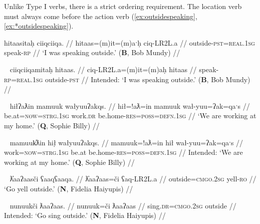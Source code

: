Unlike Type I verbs, there is a strict ordering requirement. The location verb must always come before the action verb (\ref{ex:outsidespeaking}, \ref{ex:*outsidespeaking}). 

\ex \label{ex:outsidespeaking}
\begingl
\glpreamble hitaasitaḥ ciiqciiqa. //
\gla hitaas=(m)it=(m)aˑḥ ciq-LR2L.a  //
\glb outside-\textsc{pst}=\textsc{real.1sg} speak-\textsc{rp} //
\glft `I was speaking outside.' (\textbf{B}, Bob Mundy) //
\endgl
\xe

\ex~ \label{ex:*outsidespeaking}
\begingl
\glpreamble *ciiqciiqamitaḥ hitaas. //
\gla ciq-LR2L.a=(m)it=(m)aḥ hitaas  //
\glb speak-\textsc{rp}=\textsc{real.1sg} outside-\textsc{pst} //
\glft Intended: `I was speaking outside.' (\textbf{B}, Bob Mundy) //
\endgl
\xe

\ex~ \label{ex:workathome}
\begingl
\glpreamble hiłʔaƛin mamuuk wałyuuʔakqs. //
\gla hił=!aƛ=in mamuuk wał-yuu=ʔak=qaˑs  //
\glb be.at=\textsc{now}=\textsc{strg.1sg} work.\textsc{dr} be.home-\textsc{res}=\textsc{poss}=\textsc{defn.1sg} //
\glft `We are working at my home.' (\textbf{Q}, Sophie Billy) //
\endgl
\xe

\ex~ \label{ex:*workathome}
\begingl
\glpreamble *mamuuk̓ƛin hił̣ wałyuuʔakqs. //
\gla mamuuk=!aƛ=in hił wał-yuu=ʔak=qaˑs  //
\glb work=\textsc{now}=\textsc{strg.1sg} be.at be.home-\textsc{res}=\textsc{poss}=\textsc{defn.1sg} //
\glft Intended: `We are working at my home.' (\textbf{Q}, Sophie Billy) //
\endgl
\xe

\ex~ \label{ex:shoutoutside}
\begingl
\glpreamble ƛ̓aaʔaasči ʕaaqʕaaqa. //
\gla ƛ̓aaʔaas=či ʕaq-LR2L.a  //
\glb outside=\textsc{cmgo.2sg} yell-\textsc{ro} //
\glft `Go yell outside.' (\textbf{N}, Fidelia Haiyupis) //
\endgl
\xe

\ex~ \label{ex:*singoutside}
\begingl
\glpreamble *nunuukči ƛaaʔaas. //
\gla nunuuk=či ƛaaʔaas  //
\glb sing.\textsc{dr}=\textsc{cmgo.2sg} outside //
\glft Intended: `Go sing outside.'\footnotemark{} (\textbf{N}, Fidelia Haiyupis) //
\endgl
\xe



